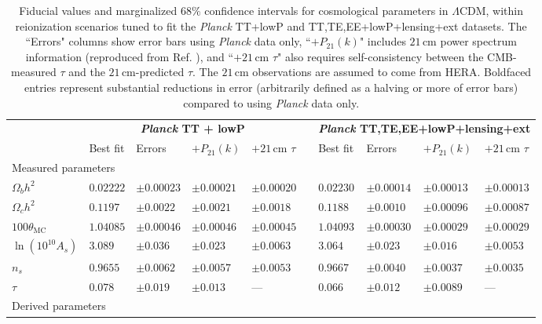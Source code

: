 \documentclass[twocolumn,aps,prd,nofootinbib,showpacs,superscriptaddress]{revtex4-1}
\begin{document}
\begin{table}
\caption{\label{tab:CosmoParams} Fiducial values and marginalized $68\%$ confidence intervals for cosmological parameters in $\Lambda$CDM, within reionization scenarios tuned to fit the \emph{Planck} TT+lowP and TT,TE,EE+lowP+lensing+ext datasets. The ``Errors" columns show error bars using \emph{Planck} data only, ``$+P_{21} (k)$" includes $21\,\textrm{cm}$ power spectrum information (reproduced from Ref. \cite{Liu_in_prep}), and ``$+21\,\textrm{cm}$ $\tau$" also requires self-consistency between the CMB-measured $\tau$ and the $21\,\textrm{cm}$-predicted $\tau$. The $21\,\textrm{cm}$ observations are assumed to come from HERA. Boldfaced entries represent substantial reductions in error (arbitrarily defined as a halving or more of error bars) compared to using \emph{Planck} data only.}
\begin{ruledtabular}
\begin{tabular}{lllllcllll}
 & \multicolumn{4}{c}{\textbf{\emph{Planck} TT + lowP}} && \multicolumn{4}{l}{\textbf{ \emph{Planck} TT,TE,EE+lowP+lensing+ext}  } \\
 & Best fit & Errors &  $+P_{21} (k)$ &$+21\,\textrm{cm}$ $\tau$&& Best fit & Errors &  $+P_{21} (k)$ &  $+21\,\textrm{cm}$ $\tau$\\
\hline
\multicolumn{7}{l}{Measured parameters} \\
$\Omega_b h^2$ \dotfill & $0.02222 $&$ \pm 0.00023$ & $\pm 0.00021$ &  $\pm 0.00020$ && $0.02230 $&$\pm 0.00014$ & $\pm 0.00013$ &  $\pm 0.00013$ \\
$\Omega_c h^2$ \dotfill & $0.1197$&$ \pm 0.0022$  & $\pm 0.0021$ &  $\pm 0.0018$ && $0.1188$&$ \pm 0.0010$ & $\pm 0.00096$ &  $\pm 0.00087$ \\
$100 \theta_\textrm{MC}$\dotfill  & $1.04085 $&$\pm 0.00046$ & $\pm 0.00046$ &  $\pm 0.00045$ & &$1.04093 $&$\pm 0.00030$ & $\pm 0.00029$ & $\pm 0.00029$ \\
$\ln ( 10^{10} A_s) $ \dotfill & $3.089 $&$\pm 0.036$ & $\pm 0.023$ &  $\mathbf{\pm 0.0063}$ & &$3.064$&$ \pm 0.023$ & $\pm 0.016$ & $\mathbf{\pm 0.0053}$  \\
$ n_s $\dotfill  & $ 0.9655$&$ \pm 0.0062$ & $\pm 0.0057$ &  $\pm 0.0053$ && $0.9667$&$ \pm 0.0040$ & $\pm 0.0037$ &  $\pm 0.0035$ \\
$ \tau $ \dotfill & $0.078 $&$\pm 0.019$ & $\pm 0.013$ &  ---  && $0.066 $&$\pm 0.012$ & $\pm 0.0089$ &  --- \\
\hline
\multicolumn{7}{l}{Derived parameters} \\

\end{tabular}
\end{ruledtabular}
\end{table}
\end{document}
